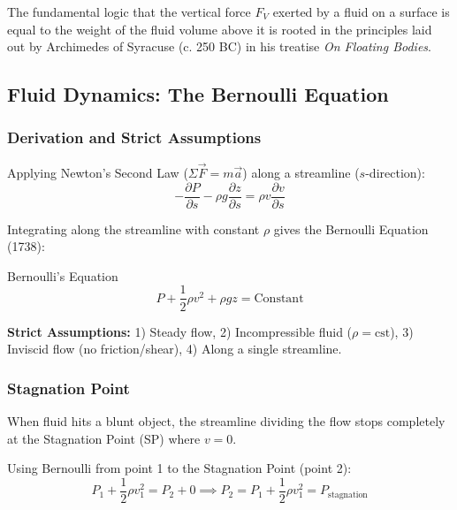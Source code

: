 \begin{conceptbox}
The fundamental logic that the vertical force $F_{V}$ exerted by a fluid on a surface is equal to the weight of the fluid volume above it is rooted in the principles laid out by Archimedes of Syracuse (c. 250 BC) in his treatise \textit{On Floating Bodies}.
\end{conceptbox}

\subsection{Fluid Dynamics: The Bernoulli Equation}

\subsubsection{Derivation and Strict Assumptions}

Applying Newton's Second Law ($\Sigma\vec{F} = m\vec{a}$) along a streamline ($s$-direction):
\begin{equation*}
    -\frac{\partial P}{\partial s} - \rho g \frac{\partial z}{\partial s} = \rho v \frac{\partial v}{\partial s}
\end{equation*}

Integrating along the streamline with constant $\rho$ gives the Bernoulli Equation (1738):

\begin{eqbox}{Bernoulli's Equation}
\begin{equation}
    P + \frac{1}{2}\rho v^{2} + \rho gz = \text{Constant}
\end{equation}
\end{eqbox}

\textbf{Strict Assumptions:} 1) Steady flow, 2) Incompressible fluid ($\rho = \text{cst}$), 3) Inviscid flow (no friction/shear), 4) Along a single streamline.

\subsubsection{Stagnation Point}

When fluid hits a blunt object, the streamline dividing the flow stops completely at the Stagnation Point (SP) where $v = 0$.

Using Bernoulli from point 1 to the Stagnation Point (point 2):
\begin{equation*}
    P_{1} + \frac{1}{2}\rho v_{1}^{2} = P_{2} + 0 \implies P_{2} = P_{1} + \frac{1}{2}\rho v_{1}^{2} = P_{\text{stagnation}}
\end{equation*}

